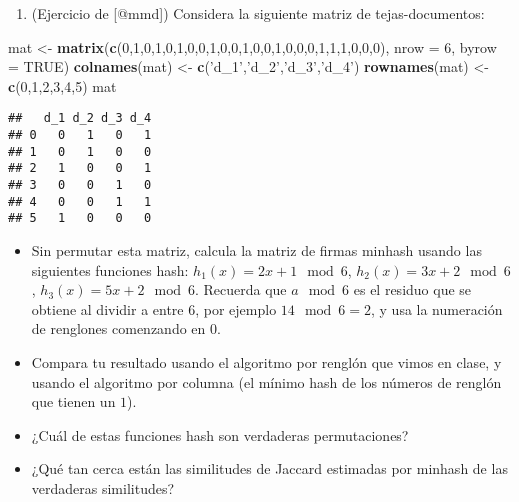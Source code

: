 \documentclass[]{article}
\newenvironment{Shaded}{\begin{snugshade}}{\end{snugshade}}
\newcommand{\KeywordTok}[1]{\textcolor[rgb]{0.13,0.29,0.53}{\textbf{#1}}}
\newcommand{\DataTypeTok}[1]{\textcolor[rgb]{0.13,0.29,0.53}{#1}}
\newcommand{\DecValTok}[1]{\textcolor[rgb]{0.00,0.00,0.81}{#1}}
\newcommand{\StringTok}[1]{\textcolor[rgb]{0.31,0.60,0.02}{#1}}
\newcommand{\OtherTok}[1]{\textcolor[rgb]{0.56,0.35,0.01}{#1}}
\newcommand{\NormalTok}[1]{#1}
\providecommand{\tightlist}{%
  \setlength{\itemsep}{0pt}\setlength{\parskip}{0pt}}
\begin{document}
\begin{enumerate}
\def\labelenumi{\arabic{enumi}.}
\setcounter{enumi}{1}
\tightlist
\item
  (Ejercicio de {[}@mmd{]}) Considera la siguiente matriz de
  tejas-documentos:
\end{enumerate}

\begin{Shaded}
\begin{Highlighting}[]
\NormalTok{mat <-}\StringTok{ }\KeywordTok{matrix}\NormalTok{(}\KeywordTok{c}\NormalTok{(}\DecValTok{0}\NormalTok{,}\DecValTok{1}\NormalTok{,}\DecValTok{0}\NormalTok{,}\DecValTok{1}\NormalTok{,}\DecValTok{0}\NormalTok{,}\DecValTok{1}\NormalTok{,}\DecValTok{0}\NormalTok{,}\DecValTok{0}\NormalTok{,}\DecValTok{1}\NormalTok{,}\DecValTok{0}\NormalTok{,}\DecValTok{0}\NormalTok{,}\DecValTok{1}\NormalTok{,}\DecValTok{0}\NormalTok{,}\DecValTok{0}\NormalTok{,}\DecValTok{1}\NormalTok{,}\DecValTok{0}\NormalTok{,}\DecValTok{0}\NormalTok{,}\DecValTok{0}\NormalTok{,}\DecValTok{1}\NormalTok{,}\DecValTok{1}\NormalTok{,}\DecValTok{1}\NormalTok{,}\DecValTok{0}\NormalTok{,}\DecValTok{0}\NormalTok{,}\DecValTok{0}\NormalTok{),}
              \DataTypeTok{nrow =} \DecValTok{6}\NormalTok{, }\DataTypeTok{byrow =} \OtherTok{TRUE}\NormalTok{)}
\KeywordTok{colnames}\NormalTok{(mat) <-}\StringTok{ }\KeywordTok{c}\NormalTok{(}\StringTok{'d_1'}\NormalTok{,}\StringTok{'d_2'}\NormalTok{,}\StringTok{'d_3'}\NormalTok{,}\StringTok{'d_4'}\NormalTok{)}
\KeywordTok{rownames}\NormalTok{(mat) <-}\StringTok{ }\KeywordTok{c}\NormalTok{(}\DecValTok{0}\NormalTok{,}\DecValTok{1}\NormalTok{,}\DecValTok{2}\NormalTok{,}\DecValTok{3}\NormalTok{,}\DecValTok{4}\NormalTok{,}\DecValTok{5}\NormalTok{)}
\NormalTok{mat}
\end{Highlighting}
\end{Shaded}

\begin{verbatim}
##   d_1 d_2 d_3 d_4
## 0   0   1   0   1
## 1   0   1   0   0
## 2   1   0   0   1
## 3   0   0   1   0
## 4   0   0   1   1
## 5   1   0   0   0
\end{verbatim}

\begin{itemize}
\tightlist
\item
  Sin permutar esta matriz, calcula la matriz de firmas minhash usando
  las siguientes funciones hash: \(h_1(x) = 2x+1\mod 6\),
  \(h_2(x) = 3x+2\mod 6\), \(h_3(x)=5x+2\mod 6\). Recuerda que
  \(a\mod 6\) es el residuo que se obtiene al dividir a entre \(6\), por
  ejemplo \(14\mod 6 = 2\), y usa la numeración de renglones comenzando
  en \(0\).
\item
  Compara tu resultado usando el algoritmo por renglón que vimos en
  clase, y usando el algoritmo por columna (el mínimo hash de los
  números de renglón que tienen un \(1\)).
\item
  ¿Cuál de estas funciones hash son verdaderas permutaciones?
\item
  ¿Qué tan cerca están las similitudes de Jaccard estimadas por minhash
  de las verdaderas similitudes?
\end{itemize}
\end{document}
